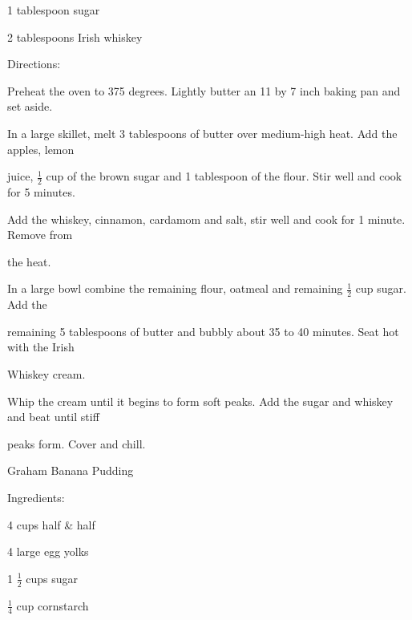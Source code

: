 \documentclass[a4paper,portrait,12pt]{book}
\begin{document}
1 tablespoon sugar




2 tablespoons Irish whiskey




Directions:




Preheat the oven to 375 degrees. Lightly butter an 11 by 7 inch baking pan and set aside.




In a large skillet, melt 3 tablespoons of butter over medium-high heat. Add the apples, lemon




juice, $\frac{1}{2}$ cup of the brown sugar and 1 tablespoon of the flour. Stir well and cook for 5 minutes.




Add the whiskey, cinnamon, cardamom and salt, stir well and cook for 1 minute. Remove from




the heat.




In a large bowl combine the remaining flour, oatmeal and remaining $\frac{1}{2}$ cup sugar. Add the




remaining 5 tablespoons of butter and bubbly about 35 to 40 minutes. Seat hot with the Irish




Whiskey cream.




Whip the cream until it begins to form soft peaks. Add the sugar and whiskey and beat until stiff




peaks form. Cover and chill.







\newpage
Graham Banana Pudding




Ingredients:




4 cups half \& half




4 large egg yolks




1 $\frac{1}{2}$ cups sugar




$\frac{1}{4}$ cup cornstarch
\end{document}
